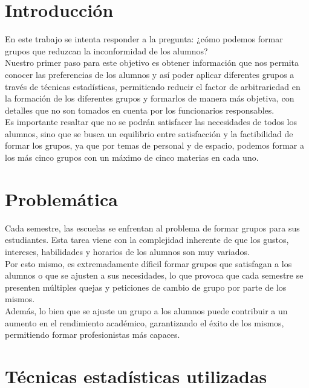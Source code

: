 \documentclass[12pt]{article}
\begin{document}
\section{Introducción}

\noindent En este trabajo se intenta responder a la pregunta: ¿cómo podemos formar grupos que reduzcan la inconformidad de los alumnos?\\
Nuestro primer paso para este objetivo es obtener información que nos permita conocer las preferencias de los alumnos y así poder
aplicar diferentes grupos a través de técnicas estadísticas, permitiendo reducir el factor de arbitrariedad en la formación de los
diferentes grupos y formarlos de manera más objetiva, con detalles que no son tomados en cuenta por los funcionarios responsables.\\
Es importante resaltar que no se podrán satisfacer las necesidades de todos los alumnos, sino que se busca un equilibrio entre satisfacción
y la factibilidad de formar los grupos, ya que por temas de personal y de espacio, podemos formar a los más cinco grupos con un máximo de
cinco materias en cada uno.

\section{Problemática}

Cada semestre, las escuelas se enfrentan al problema de formar grupos para sus estudiantes. Esta tarea viene con la complejidad
inherente de que los gustos, intereses, habilidades y horarios de los alumnos son muy variados.\\
Por esto mismo, es extremadamente díficil formar grupos que satisfagan a los alumnos o que se ajusten a sus necesidades, lo que provoca
que cada semestre se presenten múltiples quejas y peticiones de cambio de grupo por parte de los mismos.\\
Además, lo bien que se ajuste un grupo a los alumnos puede contribuir a un aumento en el rendimiento académico, garantizando el éxito
de los mismos, permitiendo formar profesionistas más capaces.\\

\newpage

\section{Técnicas estadísticas utilizadas}
\end{document}
